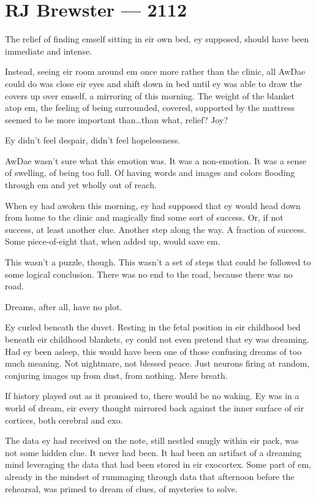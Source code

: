 \hypertarget{rj-brewster-2112}{%
\chapter*{RJ Brewster — 2112}\label{rj-brewster-2112}}

The relief of finding emself sitting in eir own bed, ey supposed, should have been immediate and intense.

Instead, seeing eir room around em once more rather than the clinic, all AwDae could do was close eir eyes and shift down in bed until ey was able to draw the covers up over emself, a mirroring of this morning. The weight of the blanket atop em, the feeling of being surrounded, covered, supported by the mattress seemed to be more important than\ldots{}than what, relief? Joy?

Ey didn't feel despair, didn't feel hopelessness.

AwDae wasn't sure what this emotion was. It was a non-emotion. It was a sense of swelling, of being too full. Of having words and images and colors flooding through em and yet wholly out of reach.

When ey had awoken this morning, ey had supposed that ey would head down from home to the clinic and magically find some sort of success. Or, if not success, at least another clue. Another step along the way. A fraction of success. Some piece-of-eight that, when added up, would save em.

This wasn't a puzzle, though. This wasn't a set of steps that could be followed to some logical conclusion. There was no end to the road, because there was no road.

Dreams, after all, have no plot.

Ey curled beneath the duvet. Resting in the fetal position in eir childhood bed beneath eir childhood blankets, ey could not even pretend that ey was dreaming. Had ey been asleep, this would have been one of those confusing dreams of too much meaning. Not nightmare, not blessed peace. Just neurons firing at random, conjuring images up from dust, from nothing. Mere breath.

If history played out as it promised to, there would be no waking. Ey was in a world of dream, eir every thought mirrored back against the inner surface of eir cortices, both cerebral and exo.

The data ey had received on the note, still nestled snugly within eir pack, was not some hidden clue. It never had been. It had been an artifact of a dreaming mind leveraging the data that had been stored in eir exocortex. Some part of em, already in the mindset of rummaging through data that afternoon before the rehearsal, was primed to dream of clues, of mysteries to solve.

